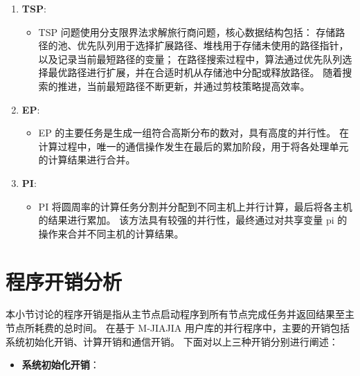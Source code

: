 {\begin{enumerate}[leftmargin=1em, align=left]
\begin{itemize}[leftmargin=*, nosep]
                        在并行实现中，红黑两个数组被分为大小相近的矩形块，并分配给不同的处理单元进行计算，
                        计算完成后，各处理单元通过 barrier 操作同步，确保所有计算节点都能获取到最新的结果。
              \end{itemize}
        \item \textbf{TSP}:
              \begin{itemize}[leftmargin=*, nosep]
                  \item TSP 问题使用分支限界法求解旅行商问题，核心数据结构包括：
                        存储路径的池、优先队列用于选择扩展路径、堆栈用于存储未使用的路径指针，以及记录当前最短路径的变量；
                        在路径搜索过程中，算法通过优先队列选择最优路径进行扩展，并在合适时机从存储池中分配或释放路径。
                        随着搜索的推进，当前最短路径不断更新，并通过剪枝策略提高效率。
              \end{itemize}
        \item \textbf{EP}:
              \begin{itemize}[leftmargin=*, nosep]
                  \item EP 的主要任务是生成一组符合高斯分布的数对，具有高度的并行性。
                        在计算过程中，唯一的通信操作发生在最后的累加阶段，用于将各处理单元的计算结果进行合并。
              \end{itemize}
        \item \textbf{PI}:
              \begin{itemize}[leftmargin=*, nosep]
                  \item PI 将圆周率的计算任务分割并分配到不同主机上并行计算，最后将各主机的结果进行累加。
                        该方法具有较强的并行性，最终通过对共享变量 pi 的操作来合并不同主机的计算结果。
              \end{itemize}
    \end{enumerate}


    \section{程序开销分析}\label{sec:程序开销分析}
    本小节讨论的程序开销是指从主节点启动程序到所有节点完成任务并返回结果至主节点所耗费的总时间。
    在基于 M-JIAJIA 用户库的并行程序中，主要的开销包括系统初始化开销、计算开销和通信开销。
    下面对以上三种开销分别进行阐述：
    \begin{itemize}
        \item \textbf{系统初始化开销}：


\end{itemize}}
